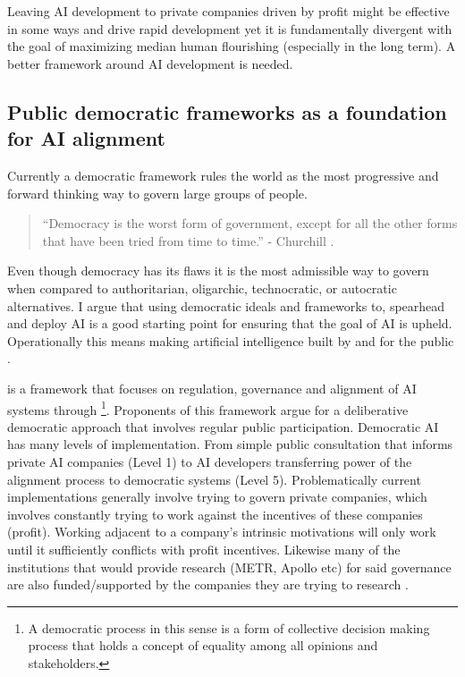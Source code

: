 Leaving AI development to private companies driven by profit might be effective in some ways and drive rapid development yet it is fundamentally divergent with the goal of maximizing median human flourishing (especially in the long term). A better framework around AI development is needed.

\subsection{Public democratic frameworks as a foundation for AI alignment}

Currently a democratic framework rules the world as the most progressive and forward thinking way to govern large groups of people.

\begin{quote}
``Democracy is the worst form of government, except for all the other forms that have been tried from time to time.'' - Churchill \cite{churchillwinstonsSpeechHouseCommons1947}.
\end{quote}

Even though democracy has its flaws it is the most admissible way to govern when compared to authoritarian, oligarchic, technocratic, or autocratic alternatives. I argue that using democratic ideals and frameworks to, spearhead and deploy AI is a good starting point for ensuring that the goal of AI is upheld. Operationally this means making artificial intelligence built by and for the public \cite{publicaiPublicAIWhite2024,sandersBuildAIPeople2023,ovadyaDemocraticAIPossible2025}.

 \cite{ovadyaDemocraticAIPossible2025} is a framework that focuses on regulation, governance and alignment of AI systems through \footnote{A democratic process in this sense is a form of collective decision making process that holds a concept of equality among all opinions and stakeholders.}. Proponents of this framework argue for a deliberative democratic approach that involves regular public participation. Democratic AI has many levels of implementation. From simple public consultation that informs private AI companies (Level 1) to AI developers transferring power of the alignment process to democratic systems (Level 5). Problematically current implementations generally involve trying to govern private companies, which involves constantly trying to work against the incentives of these companies (profit). Working adjacent to a company's intrinsic motivations will only work until it sufficiently conflicts with profit incentives. Likewise many of the institutions that would provide research (METR, Apollo etc) for said governance are also funded/supported by the companies they are trying to research \cite{crawfordAtlasAIPower2021}.

